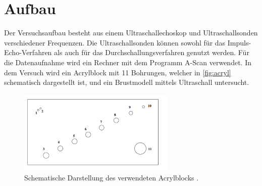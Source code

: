 \section{Aufbau}
\label{sec:Aufbau}

Der Versuchsaufbau besteht aus einem Ultraschallechoskop und Ultraschallsonden verschiedener Frequenzen. 
Die Ultraschallsonden können sowohl für das Impuls-Echo-Verfahren als auch für das Durchschallungsverfahren genutzt werden.
Für die Datenaufnahme wird ein Rechner mit dem Programm A-Scan verwendet. In dem Versuch wird ein 
Acrylblock mit 11 Bohrungen, welcher in \autoref{fig:acryl} schematisch dargestellt ist, und ein Brustmodell 
mittels Ultraschall untersucht.

\begin{figure}
    \centering
    \includegraphics[height = 4cm]{block.pdf}
    \caption{Schematische Darstellung des verwendeten Acrylblocks \cite{apus1}.}
    \label{fig:acryl}
\end{figure}
